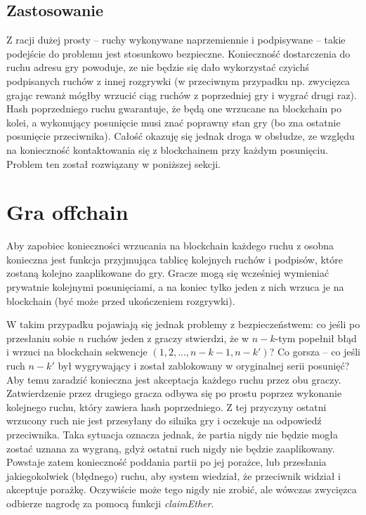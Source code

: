 \documentclass[a4paper, 12pt, onecolumn, one]{article}
\begin{document}
  \subsection{Zastosowanie}
	Z racji dużej prosty -- ruchy wykonywane naprzemiennie i podpisywane -- takie podejście do problemu jest stosunkowo bezpieczne. Konieczność dostarczenia do ruchu adresu gry powoduje, ze nie będzie się dało wykorzystać czyichś podpisanych ruchów z innej rozgrywki (w przeciwnym przypadku np. zwycięzca grając rewanż mógłby wrzucić ciąg ruchów z poprzedniej gry i wygrać drugi raz). Hash poprzedniego ruchu gwarantuje, że będą one wrzucane na blockchain po kolei, a wykonujący posunięcie musi znać poprawny stan gry (bo zna ostatnie posunięcie przeciwnika). Całość okazuję się jednak droga w obsłudze, ze względu na konieczność kontaktowania się z blockchainem przy każdym posunięciu. Problem ten został rozwiązany w poniższej sekcji.

\section{Gra offchain}
	Aby zapobiec konieczności wrzucania na blockchain każdego ruchu z osobna konieczna jest funkcja przyjmująca tablicę kolejnych ruchów i podpisów, które zostaną kolejno zaaplikowane do gry. Gracze mogą się wcześniej wymieniać prywatnie kolejnymi posunięciami, a na koniec tylko jeden z nich wrzuca je na blockchain (być może przed ukończeniem rozgrywki).
	
	W takim przypadku pojawiają się jednak problemy z bezpieczeństwem: co jeśli po przesłaniu sobie $n$ ruchów jeden z graczy stwierdzi, że w $n-k$-tym popełnił błąd i wrzuci na blockchain sekwencje \mbox{$(1,2,...,n-k-1,n-k')$}? Co gorsza -- co jeśli ruch $n-k'$ był wygrywający i został zablokowany w oryginalnej serii posunięć? Aby temu zaradzić konieczna jest akceptacja każdego ruchu przez obu graczy. Zatwierdzenie przez drugiego gracza odbywa się po prostu poprzez wykonanie kolejnego ruchu, który zawiera hash poprzedniego. Z tej przyczyny ostatni wrzucony ruch nie jest przesyłany do silnika gry i oczekuje na odpowiedź przeciwnika. Taka sytuacja oznacza jednak, że partia nigdy nie będzie mogła zostać uznana za wygraną, gdyż ostatni ruch nigdy nie będzie zaaplikowany. Powstaje zatem konieczność poddania partii po jej porażce, lub przesłania jakiegokolwiek (błędnego) ruchu, aby system wiedział, że przeciwnik widział i akceptuje porażkę. Oczywiście może tego nigdy nie zrobić, ale wówczas zwycięzca odbierze nagrodę za pomocą funkcji \textit{claimEther}.
	
\end{document}
